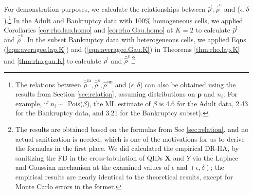 \documentclass[10pt,journal,compsoc]{IEEEtran}
\newcommand{\X}{\mathbf{X}}
\begin{document}
For demonstration purposes, we calculate the relationships between $\bar{\rho}^{\text{l}},\bar{\hat{\rho}}^{\text{e}}$  and ($\epsilon,\delta$).\footnote{The relations between $\bar{\hat{\rho}}^{\text{m}}, \bar{\hat{\rho}}^{\text{s}},\hat{\rho}^{\text{sm}}$  and ($\epsilon,\delta$)  can also be obtained using the results from Section \ref{sec:relation}, assuming distributions on $\mathbf{p}$ and $n_i$. For example, if $n_i\sim$ Pois($\beta$), the ML estimate of $\beta$ is 4.6 for the Adult data, 2.43 for the Bankruptcy data, and 3.21 for the Bankruptcy subset).} In the Adult and Bankruptcy data with 100\%  homogeneous cells, we applied  Corollaries \ref{cor:rho.lap.homo} and \ref{cor:rho.Gau.homo} at $K=2$ to calculate $\bar{\rho}^{\text{l}}$ and $\bar{\hat{\rho}}^{\text{e}}$. In the  subset Bankruptcy data with heterogeneous cells, we applied Eqns  (\ref{eqn:averagee.lap.K}) and (\ref{eqn:averagee.Gau.K}) in Theorems \ref{thm:rho.lap.K} and \ref{thm:rho.gau.K} to calculate $\bar{\rho}^{\text{l}}$ and $\bar{\hat{\rho}}^{\text{e}}$.\footnote{The results are obtained based on the formulas from Sec  \ref{sec:relation}, and no actual sanitization is needed, which is one of the motivations for us to derive the formulas in the first place. We did calculated the empirical DR-HA, by sanitizing  the FD in the cross-tabulation of QIDs $\X$ and $Y$ via the Laplace and Gaussian mechanism at the examined values of $\epsilon$ and $(\epsilon,\delta)$; the empirical results are nearly identical to the theoretical results, except for Monte Carlo errors in the former.} 
\end{document}
